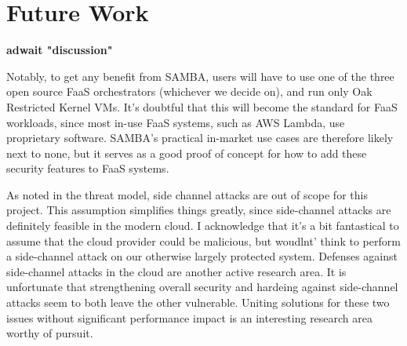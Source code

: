 \section{Future Work}
\label{sec:future}

\textbf{adwait "discussion"}

Notably, to get any benefit from SAMBA, users will have to use one of the three open source FaaS orchestrators (whichever we decide on), and run only Oak Restricted Kernel VMs.
It's doubtful that this will become the standard for FaaS workloads, since most in-use FaaS systems, such as AWS Lambda, use proprietary software.
SAMBA's practical in-market use cases are therefore likely next to none, but it serves as a good proof of concept for how to add these security features to FaaS systems.

As noted in the threat model, side channel attacks are out of scope for this project.
This assumption simplifies things greatly, since side-channel attacks are definitely feasible in the modern cloud. \cite{zhao_everywhere_2024} \cite{zhao_last-level_2024}
I acknowledge that it's a bit fantastical to assume that the cloud provider could be malicious, but woudlnt' think to perform a side-channel attack on our otherwise largely protected system.
Defenses against side-channel attacks in the cloud are another active research area.
It is unfortunate that strengthening overall security and hardeing against side-channel attacks seem to both leave the other vulnerable.
Uniting solutions for these two issues without significant performance impact is an interesting research area worthy of pursuit.
